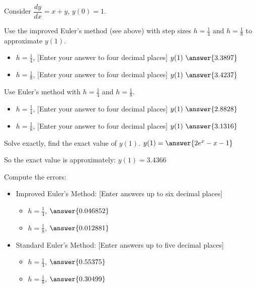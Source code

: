 \documentclass{ximera}
\begin{document}
\begin{exercise}%
    Consider $\dfrac{dy}{dx} = x+y$, $y(0)=1$.
    
    Use the improved Euler's method (see above) with step sizes $h=\frac{1}{4}$ and $h=\frac{1}{8}$ to approximate $y(1)$.
    \begin{itemize}
        \item $h = \frac{1}{4}$, [Enter your answer to four decimal places] $y(1) ~ \answer{3.3897}$
        \item $h = \frac{1}{8}$, [Enter your answer to four decimal places] $y(1) ~ \answer{3.4237}$
    \end{itemize}
    \begin{problem}
        Use Euler's method with $h=\frac{1}{4}$ and $h=\frac{1}{8}$.
        \begin{itemize}
            \item $h = \frac{1}{4}$, [Enter your answer to four decimal places] $y(1) ~ \answer{2.8828}$
            \item $h = \frac{1}{8}$, [Enter your answer to four decimal places] $y(1) ~ \answer{3.1316}$
        \end{itemize}
        \begin{problem}
            Solve exactly, find the exact value of $y(1)$. $y(1) = \answer{2e^x-x-1}$
            \begin{feedback}[correct]
                So the exact value is approximately: $y(1) = 3.4366$
            \end{feedback}
            \begin{problem}
                Compute the errors:
                \begin{itemize}
                    \item Improved Euler's Method: [Enter answers up to six decimal places]
                    \begin{itemize}
                        \item $h=\frac{1}{4}$, $\answer{0.046852}$
                        \item $h=\frac{1}{8}$, $\answer{0.012881}$
                    \end{itemize}
                    \item Standard Euler's Method: [Enter answers up to five decimal places]
                    \begin{itemize}
                        \item $h=\frac{1}{4}$, $\answer{0.55375}$
                        \item $h=\frac{1}{8}$, $\answer{0.30499}$

\end{itemize}
\end{itemize}
\end{problem}
\end{problem}
\end{problem}
\end{exercise}
\end{document}
